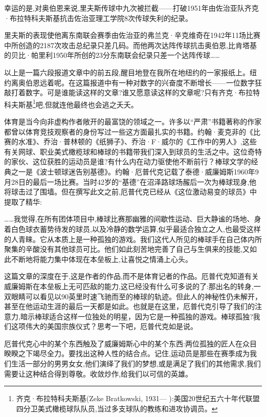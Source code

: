 幸运的是,对奥伯恩来说,里夫斯传球中九次被拦截——打破1951年由佐治亚队齐克·布拉特科夫斯基抗击佐治亚理工学院8次传球失利的纪录。

里夫斯的表现使他离东南联会赛季由佐治亚的弗兰克·辛克维奇在1942年11场比赛中所创造的2187次攻击总纪录只差几码。而他两次达阵传球抗击奥伯恩,比肯塔基的贝比·帕里利1950年所创的23分东南联会纪录只差一个达阵传球……

以上是一篇六段报道文章中的前五段,醒目地登在我所在地纽约的一家报纸上。纽约离奥伯恩远着呢。在这篇报道中有一种对数字的兴奋度不断增长——一位数字狂敲打着数字。可是谁能读这样的文章?谁又愿意读这样的文章呢?只有齐克·布拉特科夫斯基\footnote{齐克·布拉特科夫斯基(Zeke Bratkowski, 1931— ):美国20世纪五六十年代联盟四分卫美式橄榄球队队员,当过多支球队的教练和进攻协调员。}吧,但就连他最终也会逃之夭夭。

体育是当今向非虚构作者敞开的最富饶的领域之一。许多以“严肃”书籍著称的作家都曾以体育竞技观察者的身份写过一些这方面最扎实的书籍。约翰·麦克非的《比赛的水准》、乔治·普林顿的《纸狮子》、乔治·F·威尔的《工作中的男人》,这些有关网球、职业美式橄榄球和棒球的书籍带我们深入到球员的生活之中。这位奇特的家伙、这位获胜的运动员是谁?有什么内在动力驱使他不断前行？棒球文学的经典之一是《波士顿球迷告别基德》。约翰·厄普代克记载了泰德·威廉姆斯1960年9月28日的最后一场比赛。当时42岁的“基德”在沼泽路球场赧后一次为棒球现身,他将球击过了围墙。但在撰写此文之前,厄普代克已经从《这位激动易变的球员》中提取了精华:

……我觉得,在所有团体项目中,棒球比赛那幽雅的间歇性运动、巨大静谧的场地、身着白色球衣蓄势待发的球员,以及冷静的数学运算,似乎最适合独立之人,也最受这样的人青睐。它从本质上是一种孤独的游戏。我们这代人所见的棒球手在自己体内所聚集的辛酸没有其他球员可比。他们如此刻苦地完善了自己与生俱来的技能,又如此不断地将能力集中体现在本垒板上,让喜悦之情涌上心头。

这篇文章的深度在于,这是作者的作品,而不是体育记者的作品。厄普代克知道有关威廉姆斯在本垒板上无可匹敌的能力,这已经没有什么可多说的了:那出名的转身,一双眼睛可以看见以90英里时速飞驰而至的棒球的轨迹。但此人的神秘性仍未解开，甚至在他运动生涯的最后一天都是如此。也就是在这里，厄普代克引导了我们的注意力,暗示棒球适合这样一位独处的明星，因为它是一种孤独的游戏。棒球孤独?我们这项伟大的美国宗族仪式？思考一下吧，厄普代克如是说。


厄普代克心中的某个东西触及了威廉姆斯心中的某个东西:两位孤独的匠人在众目睽睽之下竭尽全力。要找出这种人性的结合点。记住,运动员是那些在赛季成为我们生活一部分的男男女女,他们演绎了我们的梦想,或是满足了我们的其他需求,我们需要让这种结合得到尊敬。收敛炒作,给我们以可信的英雄。

